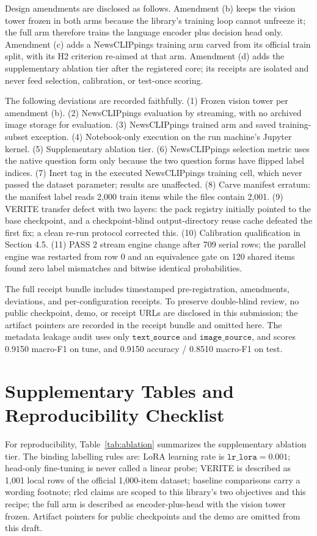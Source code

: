 \documentclass{article} %
\begin{document}
Design amendments are disclosed as follows. Amendment (b) keeps the vision tower frozen in both arms because the library's training loop cannot unfreeze it; the full arm therefore trains the language encoder plus decision head only. Amendment (c) adds a NewsCLIPpings training arm carved from its official train split, with its H2 criterion re-aimed at that arm. Amendment (d) adds the supplementary ablation tier after the registered core; its receipts are isolated and never feed selection, calibration, or test-once scoring.

The following deviations are recorded faithfully. (1) Frozen vision tower per amendment (b). (2) NewsCLIPpings evaluation by streaming, with no archived image storage for evaluation. (3) NewsCLIPpings trained arm and saved training-subset exception. (4) Notebook-only execution on the run machine's Jupyter kernel. (5) Supplementary ablation tier. (6) NewsCLIPpings selection metric uses the native question form only because the two question forms have flipped label indices. (7) Inert tag in the executed NewsCLIPpings training cell, which never passed the dataset parameter; results are unaffected. (8) Carve manifest erratum: the manifest label reads 2,000 train items while the files contain 2,001. (9) VERITE transfer defect with two layers: the pack registry initially pointed to the base checkpoint, and a checkpoint-blind output-directory reuse cache defeated the first fix; a clean re-run protocol corrected this. (10) Calibration qualification in Section 4.5. (11) PASS 2 stream engine change after 709 serial rows; the parallel engine was restarted from row 0 and an equivalence gate on 120 shared items found zero label mismatches and bitwise identical probabilities.

The full receipt bundle includes timestamped pre-registration, amendments, deviations, and per-configuration receipts. To preserve double-blind review, no public checkpoint, demo, or receipt URLs are disclosed in this submission; the artifact pointers are recorded in the receipt bundle and omitted here. The metadata leakage audit uses only \( \texttt{text\_source} \) and \( \texttt{image\_source} \), and scores 0.9150 macro-F1 on tune, and 0.9150 accuracy / 0.8510 macro-F1 on test.

\section{Supplementary Tables and Reproducibility Checklist}
\label{app:tables}
For reproducibility, Table~\ref{tab:ablation} summarizes the supplementary ablation tier. The binding labelling rules are: LoRA learning rate is \( \texttt{lr\_lora}=0.001\); head-only fine-tuning is never called a linear probe; VERITE is described as 1,001 local rows of the official 1,000-item dataset; baseline comparisons carry a wording footnote; rlcd claims are scoped to this library's two objectives and this recipe; the full arm is described as encoder-plus-head with the vision tower frozen. Artifact pointers for public checkpoints and the demo are omitted from this draft.
\end{document}
